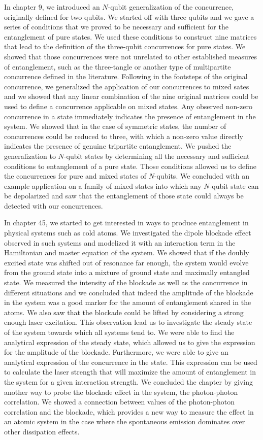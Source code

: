 In chapter 9, we introduced an $N$-qubit generalization of the concurrence, originally defined for two qubits. We started off with three qubits and we gave a series of conditions that we proved to be necessary and sufficient for the entanglement of pure states. We used these conditions to construct nine matrices that lead to the definition of the three-qubit concurrences for pure states. We showed that those concurrences were not unrelated to other established measures of entanglement, such as the three-tangle or another type of multipartite concurrence defined in the literature. Following in the footsteps of the original concurrence, we generalized the application of our concurrences to mixed sates and we showed that any linear combination of the nine original matrices could be used to define a concurrence applicable on mixed states. Any observed non-zero concurrence in a state immediately indicates the presence of entanglement in the system. We showed that in the case of symmetric states, the number of concurrences could be reduced to three, with which a non-zero value  directly indicates the presence of genuine tripartite entanglement. We pushed the generalization to $N$-qubit states by determining all the necessary and sufficient conditions to entanglement of a pure state. Those conditions allowed us to define the concurrences for pure and mixed states of $N$-qubits. We concluded with an example application on a family of mixed states into which any $N$-qubit state can be depolarized and saw that the entanglement of those state could always be detected with our concurrences.

In chapter 45, we started to get interested in ways to produce entanglement in physical systems such as cold atoms. We investigated the dipole blockade effect observed in such systems and modelized it with an interaction term in the Hamiltonian and master equation of the system. We showed that if the doubly excited state was shifted out of resonance far enough, the system would evolve from the ground state into a mixture of ground state and maximally entangled state. We measured the intensity of the blockade as well as the concurrence in different situations and we concluded that indeed the amplitude of the blockade in the system was a good marker for the amount of entanglement shared in the atoms. We also saw that the blockade could be lifted by considering a strong enough laser excitation. This observation lead us to investigate the steady state of the system towards which all  systems tend to. We were able to find the analytical expression of the steady state, which allowed us to give the expression for the amplitude of the blockade. Furthermore, we were able to give an analytical expression of the concurrence in the state. This expression can be used to calculate the laser strength that will maximize the amount of entanglement in the system for a given interaction strength. We concluded the chapter by giving another way to probe the blockade effect in the system, the photon-photon correlation. We showed a connection between values of the photon-photon correlation and the blockade, which provides a new way to measure the effect in an atomic system in the case where the spontaneous emission dominates over other dissipation effects.

